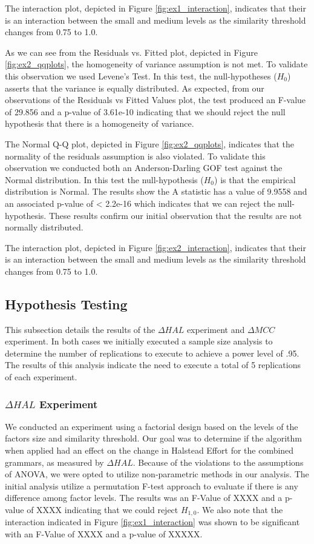 \documentclass[10pt,nocc]{xrese_report}
\begin{document}
The interaction plot, depicted in Figure \ref{fig:ex1_interaction}, indicates that their is an interaction between the small and medium levels as the similarity threshold changes from 0.75 to 1.0.


As we can see from the Residuals vs. Fitted plot, depicted in Figure \ref{fig:ex2_qqplots}, the homogeneity of variance assumption is not met. To validate this observation we used Levene's Test. In this test, the null-hypotheses ($H_0$) asserts that the variance is equally distributed. As expected, from our observations of the Residuals vs Fitted Values plot, the test produced an F-value of 29.856 and a p-value of 3.61e-10 indicating that we should reject the null hypothesis that there is a homogeneity of variance.

The Normal Q-Q plot, depicted in Figure \ref{fig:ex2_qqplots}, indicates that the normality of the residuals assumption is also violated. To validate this observation we conducted both an Anderson-Darling GOF test against the Normal distribution. In this test the null-hypothesis ($H_0$) is that the empirical distribution is Normal. The results show the A statistic has a value of 9.9558 and an associated p-value of < 2.2e-16 which indicates that we can reject the null-hypothesis. These results confirm our initial observation that the results are not normally distributed.


The interaction plot, depicted in Figure \ref{fig:ex2_interaction}, indicates that their is an interaction between the small and medium levels as the similarity threshold changes from 0.75 to 1.0.

\subsection{Hypothesis Testing}

This subsection details the results of the $\Delta HAL$ experiment and $\Delta MCC$ experiment. In both cases we initially executed a sample size analysis to determine the number of replications to execute to achieve a power level of .95. The results of this analysis indicate the need to execute a total of 5 replications of each experiment.

\subsubsection{$\Delta HAL$ Experiment}

We conducted an experiment using a factorial design based on the levels of the factors size and similarity threshold. Our goal was to determine if the algorithm when applied had an effect on the change in Halstead Effort for the combined grammars, as measured by $\Delta HAL$. Because of the violations to the assumptions of ANOVA, we were opted to utilize non-parametric methods in our analysis. The initial analysis utilize a permutation F-test approach to evaluate if there is any difference among factor levels. The results was an F-Value of XXXX and a p-value of XXXX indicating that we could reject $H_{1,0}$. We also note that the interaction indicated in Figure \ref{fig:ex1_interaction} was shown to be significant with an F-Value of XXXX and a p-value of XXXXX.
\end{document}

